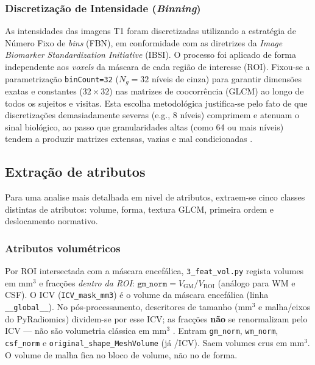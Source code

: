 \documentclass[review]{elsarticle}
\newcommand{\code}[1]{\texttt{#1}}
\begin{document}
	\subsubsection{Discretização de Intensidade (\emph{Binning})}
	
	As intensidades das imagens T1 foram discretizadas utilizando a estratégia de Número Fixo de \emph{bins} (FBN), em conformidade com as diretrizes da \emph{Image Biomarker Standardization Initiative} (IBSI). O processo foi aplicado de forma independente aos \emph{voxels} da máscara de cada região de interesse (ROI). Fixou-se a parametrização \code{binCount=32} ($N_g=32$ níveis de cinza) para garantir dimensões exatas e constantes ($32 \times 32$) nas matrizes de coocorrência (GLCM) ao longo de todos os sujeitos e visitas. Esta escolha metodológica justifica-se pelo fato de que discretizações demasiadamente severas (e.g., 8 níveis) comprimem e atenuam o sinal biológico, ao passo que granularidades altas (como 64 ou mais níveis) tendem a produzir matrizes extensas, vazias e mal condicionadas \cite{molina-2016}.
	
	\subsection{Extração de atributos}\label{sec:feature-extraction}
	
	Para uma analise mais detalhada em nivel de atributos, extraem-se cinco classes distintas de atributos: volume, forma, textura GLCM, primeira ordem e deslocamento normativo.
	
	\subsubsection{Atributos volumétricos}\label{subsubsec:feat_vol}
	
	Por ROI intersectada com a máscara encefálica, \code{3\_feat\_vol.py} regista volumes em mm$^3$ e fracções \emph{dentro da ROI}: $\mathtt{gm\_norm}=V_{\mathrm{GM}}/V_{\mathrm{ROI}}$ (análogo para WM e CSF).
	O ICV (\code{ICV\_mask\_mm3}) é o volume da máscara encefálica (linha \code{\_\_global\_\_}).
	No pós-processamento, descritores de tamanho (mm$^3$ e malha/eixos do PyRadiomics) dividem-se por esse ICV; as fracções \textbf{não} se renormalizam pelo ICV --- não são volumetria clássica em mm$^3$ \cite{wyman-2013}.
	Entram \code{gm\_norm}, \code{wm\_norm}, \code{csf\_norm} e \code{original\_shape\_MeshVolume} (já /ICV).
	Saem volumes crus em mm$^3$.
	O volume de malha fica no bloco de volume, não no de forma.
	
\end{document}
